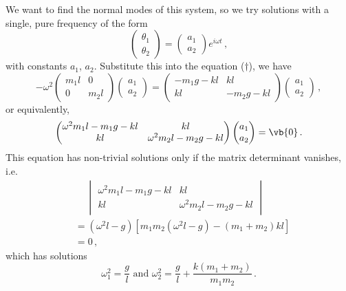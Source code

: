 \documentclass{article}
\theoremstyle{plain}\theoremheaderfont{\normalfont\itshape}\theorembodyfont{\rmfamily}\theoremseparator{.}\newtheorem*{rem}{Remark}\newtheorem*{ex}{Example}\newtheorem*{proof}{Proof}\newtheorem*{altp}{Alternative proof}
\theoremstyle{plain}\theoremheaderfont{\normalfont\bfseries}\theorembodyfont{\rmfamily}\theoremseparator{.}\newtheorem{thm}{Theorem}[section]\newtheorem{lem}[thm]{Lemma}\newtheorem{prop}[thm]{Proposition}\newtheorem*{cor}{Corollary}\newtheorem{defn}[thm]{Definition}\newtheorem{clm}[thm]{Claim}\newtheorem{clminproof}{Claim}
\theoremstyle{break}\theoremheaderfont{\normalfont\itshape}\theorembodyfont{\rmfamily}\theoremseparator{.\medskip}\newtheorem*{proofskip}{Proof}\newtheorem*{exs}{Examples}\newtheorem*{rems}{Remarks}
\theoremstyle{break}\theoremheaderfont{\normalfont\bfseries}\theorembodyfont{\rmfamily}\theoremseparator{.\medskip}\newtheorem{lemskip}[thm]{Lemma}\newtheorem{defnskip}[thm]{Definition}\newtheorem{propskip}[thm]{Proposition}\newtheorem{thmskip}[thm]{Theorem}
\numberwithin{equation}{section}
\begin{document}
	We want to find the normal modes of this system, so we try solutions with a single, pure frequency of the form
	\[\begin{pmatrix}
		\theta_1 \\ \theta_2
	\end{pmatrix}=\begin{pmatrix}
		a_1 \\ a_2
	\end{pmatrix} e^{i\omega t}\,,\]
	with constants \(a_1\), \(a_2\). Substitute this into the equation (\(\dagger\)), we have
	\[-\omega^2\begin{pmatrix}
		m_1l & 0\\
		0 & m_2l
	\end{pmatrix}\begin{pmatrix}
		a_1 \\ a_2
	\end{pmatrix}=\begin{pmatrix}
		-m_1g-kl & kl \\
		kl & -m_2g-kl
	\end{pmatrix}\begin{pmatrix}
		a_1 \\ a_2
	\end{pmatrix}\,,\]
	or equivalently,
	\[\begin{pmatrix}
		\omega^2m_1l-m_1g-kl & kl \\
		kl & \omega^2m_2l-m_2g-kl
	\end{pmatrix}\begin{pmatrix}
		a_1 \\ a_2
	\end{pmatrix}=\vb{0}\,.\]
	This equation has non-trivial solutions only if the matrix determinant vanishes, i.e.
	\begin{align*}
		&\quad\,\begin{vmatrix}
			\omega^2m_1l-m_1g-kl & kl \\
			kl & \omega^2m_2l-m_2g-kl
		\end{vmatrix}\\
		&=(\omega^2l-g)[m_1m_2(\omega^2l-g)-(m_1+m_2)kl]\\
		&=0\,,
	\end{align*}
	which has solutions
	\[\omega_1^2=\frac{g}{l}\text{ and }\omega_2^2=\frac{g}{l}+\frac{k(m_1+m_2)}{m_1m_2}\,.\]
\end{document}
